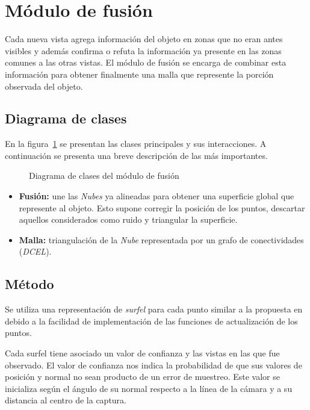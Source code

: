 \section{Módulo de fusión}
	Cada nueva vista agrega información del objeto en zonas que no eran antes visibles
	y además confirma o refuta la información ya presente en las zonas comunes a las otras vistas.
	El módulo de fusión se encarga de combinar esta información para obtener
	finalmente una malla que represente la porción observada del objeto.

	\subsection{Diagrama de clases}
		En la figura~\ref{fig:fusion_class} se presentan las clases principales y sus interacciones.
		A continuación se presenta una breve descripción de las más importantes.
		\begin{figure}
			\caption{\label{fig:fusion_class}Diagrama de clases del módulo de fusión}
		\end{figure}

		\begin{itemize}
			\item {\bfseries Fusión:} une las \emph{Nubes} ya alineadas para
				obtener una superficie global que represente al objeto.
				Esto supone corregir la posición de los puntos, descartar
				aquellos considerados como ruido y triangular la superficie.
			\item {\bfseries Malla:} triangulación de la \emph{Nube} representada por un grafo de conectividades (\emph{DCEL}).
		\end{itemize}


	\subsection{Método}
	Se utiliza una representación de \emph{surfel} para cada punto similar a la propuesta en \cite{5457479} %
	debido a la facilidad de implementación de las funciones de actualización de los puntos.

	Cada surfel tiene asociado un valor de confianza y las vistas en las que
	fue observado.  El valor de confianza nos indica la probabilidad de que sus
	valores de posición y normal no sean producto de un error de muestreo.
	Este valor se inicializa según el ángulo de su normal respecto a la línea
	de la cámara y a su distancia al centro de la captura.


